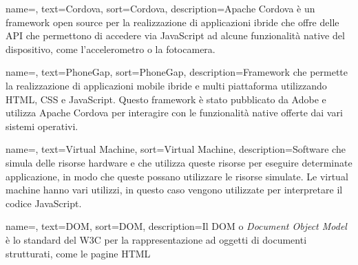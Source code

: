 
\renewcommand{\acronymname}{Acronimi e abbreviazioni}

    




\renewcommand{\glossaryname}{Glossario}

{
    name=,
    text=Cordova,
    sort=Cordova,
    description={Apache Cordova è un framework open source per la realizzazione di applicazioni ibride che offre delle API che permettono di accedere via JavaScript ad alcune funzionalità native del dispositivo, come l'accelerometro o la fotocamera.}
}

{
    name=,
    text=PhoneGap,
    sort=PhoneGap,
    description={Framework che permette la realizzazione di applicazioni mobile ibride e multi piattaforma utilizzando HTML, CSS e JavaScript. Questo framework è stato pubblicato da Adobe e utilizza Apache Cordova per   interagire con le funzionalità native offerte dai vari sistemi operativi.}
}


{
    name=,
    text=Virtual Machine,
    sort=Virtual Machine,
    description={Software che simula delle risorse hardware e che utilizza queste risorse per eseguire determinate applicazione, in modo che queste possano utilizzare le risorse simulate. Le virtual machine hanno vari utilizzi, in questo caso vengono utilizzate per interpretare il codice JavaScript.}
}

{
    name=,
    text=DOM,
    sort=DOM,
    description={Il DOM o \textit{Document Object Model} è lo standard del W3C per la rappresentazione ad oggetti di documenti strutturati, come le pagine HTML}
}

